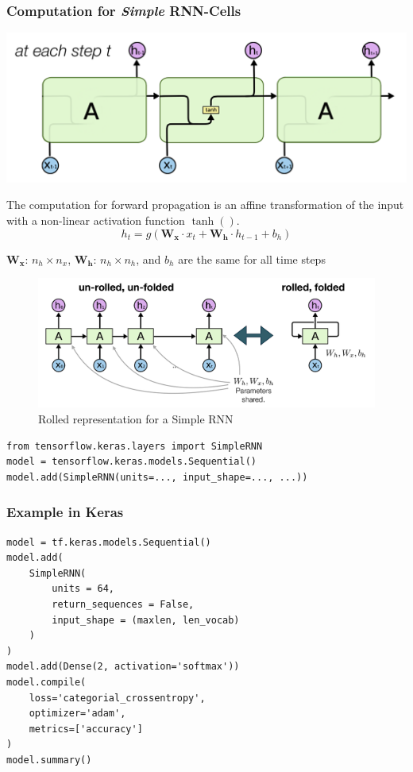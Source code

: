 \documentclass[11pt]{article}
\begin{document}
\subsubsection{Computation for \emph{Simple} RNN-Cells}
\begin{center}
	\includegraphics[width=0.6\linewidth]{img/simple_rnn_cell}
\end{center}

The computation for forward propagation is an affine transformation of the input with a non-linear activation function $\tanh()$.
\begin{equation}
	h_t = g(\textbf{W}_{\textbf{x}}\cdot x_t + \textbf{W}_{\textbf{h}}\cdot h_{t-1} + b_h)
\end{equation}

$\textbf{W}_{\textbf{x}}$: $n_h\times n_x$, $\textbf{W}_{\textbf{h}}$: $n_h\times n_h$, and $b_h$ are the same for all time steps

\begin{figure}[tbh]
	\centering
	\includegraphics[width=0.7\linewidth]{img/simple_rnn_unrolled_graph}
	\caption{Rolled representation for a Simple RNN}
	\label{fig:simplernnunrolledgraph}
\end{figure}

\begin{verbatim}
from tensorflow.keras.layers import SimpleRNN
model = tensorflow.keras.models.Sequential()
model.add(SimpleRNN(units=..., input_shape=..., ...))
\end{verbatim}

\subsubsection{Example in Keras}

\begin{verbatim}
model = tf.keras.models.Sequential()
model.add(
	SimpleRNN(
		units = 64,
		return_sequences = False,
		input_shape = (maxlen, len_vocab)
	)
)
model.add(Dense(2, activation='softmax'))
model.compile(
	loss='categorial_crossentropy',
	optimizer='adam',
	metrics=['accuracy']
)
model.summary()
\end{verbatim}
\end{document}
